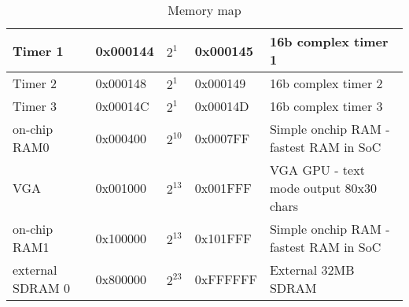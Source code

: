 \begin{table}[h]
\begin{tabular}{|l|l|l|l|l|}
        Timer 1             & 0x000144      & $2^{1}$       & 0x000145     & 16b complex timer 1                            \\ \hline
        Timer 2             & 0x000148      & $2^{1}$       & 0x000149     & 16b complex timer 2                            \\ \hline
        Timer 3             & 0x00014C      & $2^{1}$       & 0x00014D     & 16b complex timer 3                            \\ \hline
        on-chip RAM0        & 0x000400      & $2^{10}$      & 0x0007FF     & Simple onchip RAM - fastest RAM in SoC         \\ \hline
        VGA                 & 0x001000      & $2^{13}$      & 0x001FFF     & VGA GPU - text mode output 80x30 chars         \\ \hline
        on-chip RAM1        & 0x100000      & $2^{13}$      & 0x101FFF     & Simple onchip RAM - fastest RAM in SoC         \\ \hline
        external SDRAM 0    & 0x800000      & $2^{23}$      & 0xFFFFFF     & External 32MB SDRAM                            \\ \hline
    \end{tabular}
    \caption{Memory map}
    \label{tab:memory_map}
\end{table}
